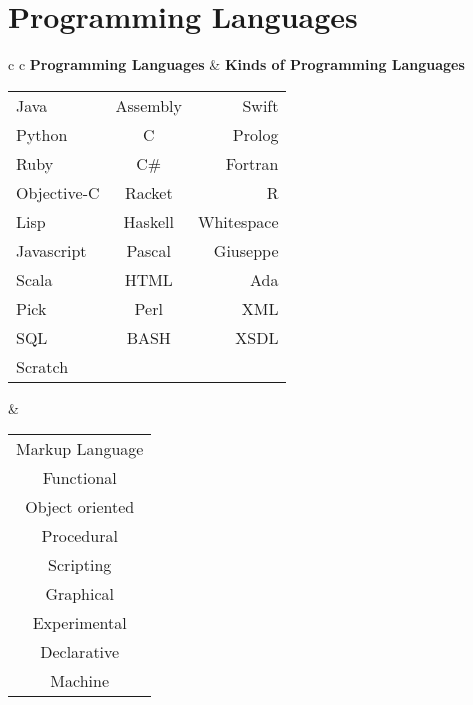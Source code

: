 \documentclass{article}
\begin{document}
\section*{Programming Languages}
\begin{tabular}{c c}
 \textbf{Programming Languages} & \textbf{Kinds of Programming Languages}\\
 \begin{tabular}{ l c r }
    Java & Assembly & Swift \\
    Python & C & Prolog \\
    Ruby & C\# & Fortran \\
    Objective-C & Racket & R \\
    Lisp & Haskell & Whitespace \\
    Javascript & Pascal & Giuseppe \\
    Scala & HTML & Ada \\
    Pick & Perl & XML \\
    SQL & BASH & XSDL \\
    Scratch &  &  \\
  \end{tabular}
  &
  \begin{tabular}{ c }
    Markup Language \\
    Functional \\
    Object oriented \\
    Procedural \\
    Scripting \\
    Graphical \\
    Experimental \\
    Declarative \\
    Machine \\
  \end{tabular}
\end{tabular}
\end{document}
